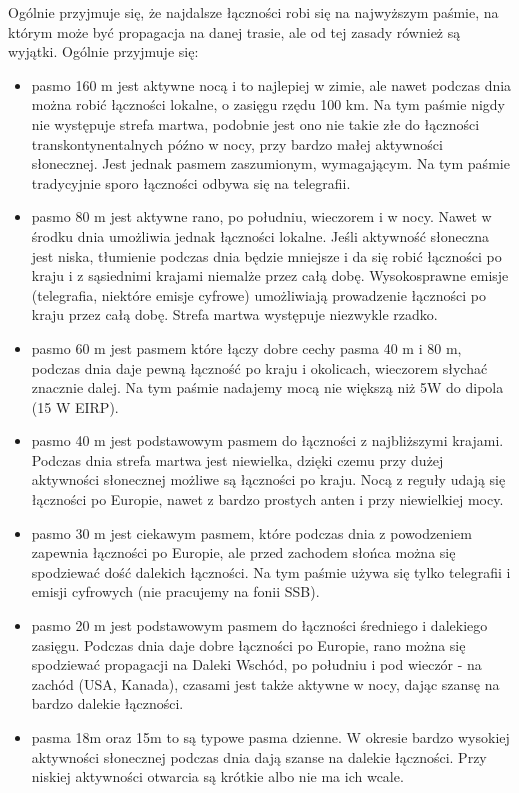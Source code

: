 \documentclass[a4paper,12pt]{article}
\begin{document}
Ogólnie przyjmuje się, że najdalsze łączności robi się na najwyższym paśmie, na którym może być propagacja na danej trasie, ale od tej zasady również są wyjątki. Ogólnie przyjmuje się:
\begin{itemize}
 \item pasmo 160 m jest aktywne nocą i to najlepiej w zimie, ale nawet podczas dnia można robić łączności lokalne, o zasięgu rzędu 100 km. Na tym paśmie nigdy nie występuje strefa martwa, podobnie jest ono nie takie złe do łączności transkontynentalnych późno w nocy, przy bardzo małej aktywności słonecznej. Jest jednak pasmem zaszumionym, wymagającym. Na tym paśmie tradycyjnie sporo łączności odbywa się na telegrafii.
 \item pasmo 80 m jest aktywne rano, po południu, wieczorem i w nocy. Nawet w środku dnia umożliwia jednak łączności lokalne. Jeśli aktywność słoneczna jest niska, tłumienie podczas dnia będzie mniejsze i da się robić łączności po kraju i z sąsiednimi krajami niemalże przez całą dobę. Wysokosprawne emisje (telegrafia, niektóre emisje cyfrowe) umożliwiają prowadzenie łączności po kraju przez całą dobę. Strefa martwa występuje niezwykle rzadko.
\item pasmo 60 m jest pasmem które łączy dobre cechy pasma 40 m i 80 m, podczas dnia daje pewną łączność po kraju i okolicach, wieczorem słychać znacznie dalej. Na tym paśmie nadajemy mocą nie większą niż 5W do dipola (15 W EIRP).
\item pasmo 40 m jest podstawowym pasmem do łączności z najbliższymi krajami. Podczas dnia strefa martwa jest niewielka, dzięki czemu przy dużej aktywności słonecznej możliwe są łączności po kraju. Nocą z reguły udają się łączności po Europie, nawet z bardzo prostych anten i przy niewielkiej mocy.
 \item pasmo 30 m jest ciekawym pasmem, które podczas dnia z powodzeniem zapewnia łączności po Europie, ale przed zachodem słońca można się spodziewać dość dalekich łączności. Na tym paśmie używa się tylko telegrafii i emisji cyfrowych (nie pracujemy na fonii SSB).
 \item pasmo 20 m jest podstawowym pasmem do łączności średniego i dalekiego zasięgu. Podczas dnia daje dobre łączności po Europie, rano można się spodziewać propagacji na Daleki Wschód, po południu i pod wieczór - na zachód (USA, Kanada), czasami jest także aktywne w nocy, dając szansę na bardzo dalekie łączności.
 \item pasma 18m oraz 15m to są typowe pasma dzienne. W okresie bardzo wysokiej aktywności słonecznej podczas dnia dają szanse na dalekie łączności. Przy niskiej aktywności otwarcia są krótkie albo nie ma ich wcale.

\end{itemize}
\end{document}
